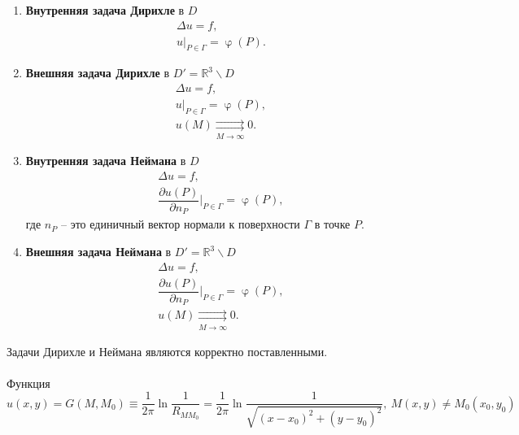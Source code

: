 \documentclass[a4paper, 12pt]{report}
\numberwithin{equation}{section}
\renewcommand{\varphi}{\upvarphi}
\renewcommand{\d}{\partial}
\begin{document}
	\begin{enumerate}
		\item \textbf{Внутренняя задача Дирихле} в $D$
		\begin{equation}
			\label{dir-in}
			\begin{gathered}
				\Delta u = f,\\
				u|_{P \in \Gamma} = \varphi(P).
			\end{gathered}
		\end{equation}
		\item \textbf{Внешняя задача Дирихле} в $D' = \mathbb R^3 \backslash D$
		\begin{equation}
			\label{dir-out}
			\begin{gathered}
				\Delta u = f,\\
				u|_{P \in \Gamma} = \varphi(P),\\
				u(M) \underset{M\to\infty}\rightrightarrows 0.
			\end{gathered}
		\end{equation}
		\item \textbf{Внутренняя задача Неймана} в $D$
		\begin{equation}
			\label{ney-in}
			\begin{gathered}
				\Delta u = f,\\
				\dfrac{\d u(P)}{\d n_P}\Big|_{P\in \Gamma} = \varphi(P),
			\end{gathered}
		\end{equation}
		где $n_P$ -- это единичный вектор нормали к поверхности $\Gamma$ в точке $P$.
		\item \textbf{Внешняя задача Неймана} в $D' = \mathbb R^3 \backslash D$
		\begin{equation}
			\label{ney-out}
			\begin{gathered}
				\Delta u = f,\\
				\dfrac{\d u(P)}{\d n_P}\Big|_{P\in \Gamma} = \varphi(P),\\
				u(M) \underset{M\to\infty}\rightrightarrows 0.
			\end{gathered}
		\end{equation}
	\end{enumerate}
	Задачи Дирихле и Неймана являются корректно поставленными.
	\\\\
	Функция
	\begin{equation}
		u(x, y) = G(M, M_0) \equiv \dfrac{1}{2\pi}\ln{\dfrac{1}{R_{MM_0}}} =  \dfrac{1}{2\pi}\ln{\dfrac{1}{\sqrt{(x-x_0)^2 + (y - y_0)^2}}},\ M(x,y) \ne M_0(x_0,y_0)
	\end{equation}
\end{document}
